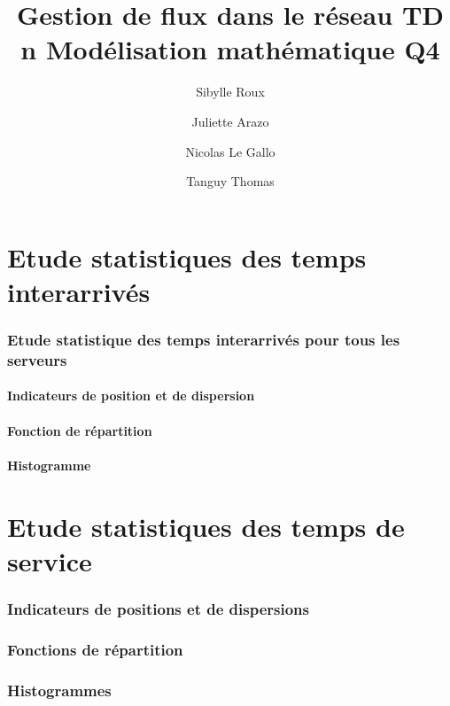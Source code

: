 \documentclass{article}
\begin{document}
\title{Gestion de flux dans le réseau
	\smallbreak
	TD n
	\smallbreak
	Modélisation mathématique
	\smallbreak
	Q4}
\author{Sibylle Roux \and Juliette Arazo \and Nicolas Le Gallo \and Tanguy Thomas}


\maketitle

\newpage

\tableofcontents

\newpage

\part{Etude statistiques des temps interarrivés}

\section{Etude statistique des temps interarrivés pour tous les serveurs}

\subsection{Indicateurs de position et de dispersion}

\subsection{Fonction de répartition}

\subsection{Histogramme}

\part{Etude statistiques des temps de service}

\section{Indicateurs de positions et de dispersions}

\section{Fonctions de répartition}

\section{Histogrammes}
\end{document}
